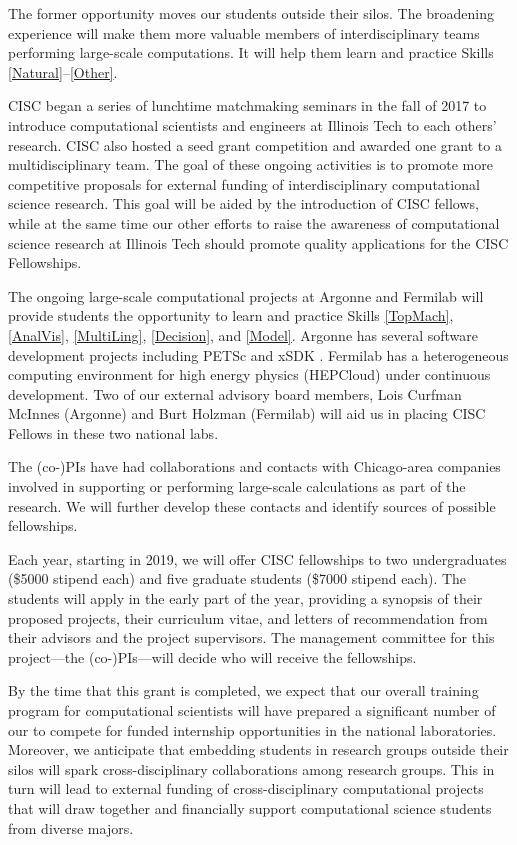 \documentclass[11pt]{NSFamsart}
\begin{document}
The former opportunity moves our students outside their silos.  The broadening experience will make them more valuable members of interdisciplinary teams performing large-scale computations.  It will help them learn and practice Skills \ref{Natural}--\ref{Other}.  

CISC began a series of lunchtime matchmaking seminars in the fall of 2017 to introduce computational scientists and engineers at Illinois Tech to each others' research.  CISC also hosted a seed grant competition and awarded one grant to a multidisciplinary team.  The goal of these ongoing activities is to promote more competitive proposals for external funding of interdisciplinary computational science research.  This goal will be aided by the introduction of CISC fellows, while at the same time our other efforts to raise the awareness of computational science research at Illinois Tech should promote quality applications for the CISC Fellowships.

The ongoing large-scale computational projects at Argonne and Fermilab will provide students the opportunity to learn and practice Skills \ref{TopMach}, \ref{AnalVis}, \ref{MultiLing}, \ref{Decision}, and \ref{Model}.  Argonne has several software development projects including PETSc \cite{petsc-web-page17} and xSDK \cite{XSDK17a}. Fermilab has a heterogeneous computing environment for high energy physics (HEPCloud) \cite{HEP18a} under continuous development.  Two of our external advisory board members, Lois Curfman McInnes (Argonne) and Burt Holzman (Fermilab) will aid us in placing CISC Fellows in these two national labs.

The (co-)PIs have had collaborations and contacts with Chicago-area companies involved in supporting or performing large-scale calculations as part of the research.  We will further develop these contacts and identify sources of possible fellowships. 

Each year, starting in 2019, we will offer CISC fellowships to two undergraduates (\$5000 stipend each) and five graduate students (\$7000 stipend each).  The students will apply in the early part of the year, providing a synopsis of their proposed projects, their curriculum vitae, and letters of recommendation from their advisors and the project supervisors.  The management committee for this project---the (co-)PIs---will decide who will receive the fellowships.  

By the time that this grant is completed, we expect that our overall training program for computational scientists will have prepared a significant number of our to compete for funded internship opportunities in the national laboratories.  Moreover, we anticipate that embedding  students in research groups outside their silos will spark cross-disciplinary collaborations among research groups.  This in turn will lead to external funding of cross-disciplinary computational projects that will draw together and financially support computational science students from diverse majors.
\end{document}
